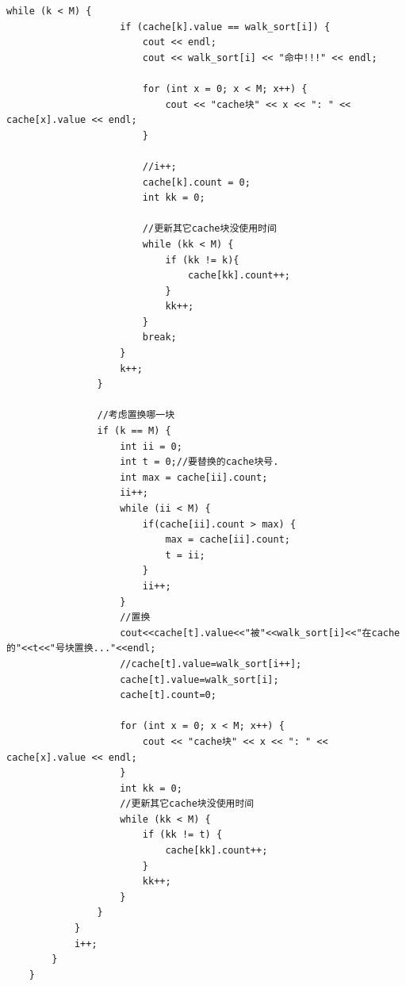 \documentclass[UTF8,12pt]{article}
\begin{document}
\begin{lstlisting}[frame=shadowbox]
                while (k < M) {
                    if (cache[k].value == walk_sort[i]) {
                        cout << endl;
                        cout << walk_sort[i] << "命中!!!" << endl;
      
                        for (int x = 0; x < M; x++) {
                            cout << "cache块" << x << ": " << cache[x].value << endl;
                        }
                        
                        //i++;
                        cache[k].count = 0;
                        int kk = 0;
                         
                        //更新其它cache块没使用时间
                        while (kk < M) {
                            if (kk != k){
                                cache[kk].count++;
                            }
                            kk++;
                        }
                        break;
                    }
                    k++;
                } 
                
                //考虑置换哪一块 
                if (k == M) {
                    int ii = 0;
                    int t = 0;//要替换的cache块号.
                    int max = cache[ii].count;
                    ii++; 
                    while (ii < M) {
                        if(cache[ii].count > max) {
                            max = cache[ii].count;
                            t = ii;
                        }
                        ii++;
                    }
                    //置换
                    cout<<cache[t].value<<"被"<<walk_sort[i]<<"在cache的"<<t<<"号块置换..."<<endl;
                    //cache[t].value=walk_sort[i++];
                    cache[t].value=walk_sort[i];
                    cache[t].count=0;
                    
                    for (int x = 0; x < M; x++) {
                        cout << "cache块" << x << ": " << cache[x].value << endl;
                    }
                    int kk = 0;                
                    //更新其它cache块没使用时间
                    while (kk < M) {
                        if (kk != t) {
                            cache[kk].count++;
                        }
                        kk++;
                    }
                }
            }
            i++;
        }
    }
\end{lstlisting}
\end{document}
